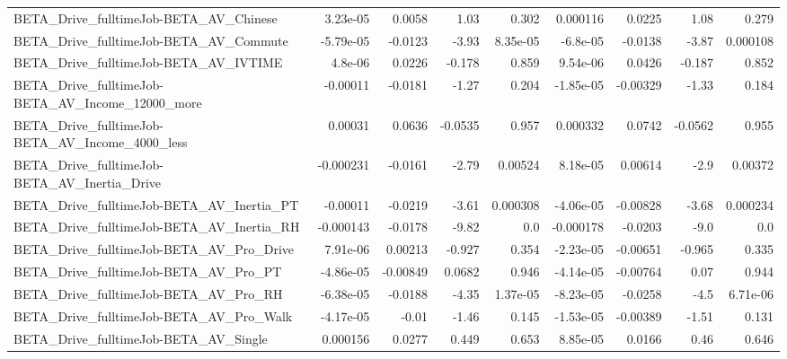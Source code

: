 \begin{tabular}{lrrrrrrrr}
BETA\_Drive\_fulltimeJob-BETA\_AV\_Chinese             &    3.23e-05 &       0.0058 &     1.03 &    0.302 &   0.000116 &      0.0225 &         1.08 &         0.279 \\
BETA\_Drive\_fulltimeJob-BETA\_AV\_Commute             &   -5.79e-05 &      -0.0123 &    -3.93 & 8.35e-05 &   -6.8e-05 &     -0.0138 &        -3.87 &      0.000108 \\
BETA\_Drive\_fulltimeJob-BETA\_AV\_IVTIME              &     4.8e-06 &       0.0226 &   -0.178 &    0.859 &   9.54e-06 &      0.0426 &       -0.187 &         0.852 \\
BETA\_Drive\_fulltimeJob-BETA\_AV\_Income\_12000\_more   &    -0.00011 &      -0.0181 &    -1.27 &    0.204 &  -1.85e-05 &    -0.00329 &        -1.33 &         0.184 \\
BETA\_Drive\_fulltimeJob-BETA\_AV\_Income\_4000\_less    &     0.00031 &       0.0636 &  -0.0535 &    0.957 &   0.000332 &      0.0742 &      -0.0562 &         0.955 \\
BETA\_Drive\_fulltimeJob-BETA\_AV\_Inertia\_Drive       &   -0.000231 &      -0.0161 &    -2.79 &  0.00524 &   8.18e-05 &     0.00614 &         -2.9 &       0.00372 \\
BETA\_Drive\_fulltimeJob-BETA\_AV\_Inertia\_PT          &    -0.00011 &      -0.0219 &    -3.61 & 0.000308 &  -4.06e-05 &    -0.00828 &        -3.68 &      0.000234 \\
BETA\_Drive\_fulltimeJob-BETA\_AV\_Inertia\_RH          &   -0.000143 &      -0.0178 &    -9.82 &      0.0 &  -0.000178 &     -0.0203 &         -9.0 &           0.0 \\
BETA\_Drive\_fulltimeJob-BETA\_AV\_Pro\_Drive           &    7.91e-06 &      0.00213 &   -0.927 &    0.354 &  -2.23e-05 &    -0.00651 &       -0.965 &         0.335 \\
BETA\_Drive\_fulltimeJob-BETA\_AV\_Pro\_PT              &   -4.86e-05 &     -0.00849 &   0.0682 &    0.946 &  -4.14e-05 &    -0.00764 &         0.07 &         0.944 \\
BETA\_Drive\_fulltimeJob-BETA\_AV\_Pro\_RH              &   -6.38e-05 &      -0.0188 &    -4.35 & 1.37e-05 &  -8.23e-05 &     -0.0258 &         -4.5 &      6.71e-06 \\
BETA\_Drive\_fulltimeJob-BETA\_AV\_Pro\_Walk            &   -4.17e-05 &        -0.01 &    -1.46 &    0.145 &  -1.53e-05 &    -0.00389 &        -1.51 &         0.131 \\
BETA\_Drive\_fulltimeJob-BETA\_AV\_Single              &    0.000156 &       0.0277 &    0.449 &    0.653 &   8.85e-05 &      0.0166 &         0.46 &         0.646 \\

\end{tabular}
